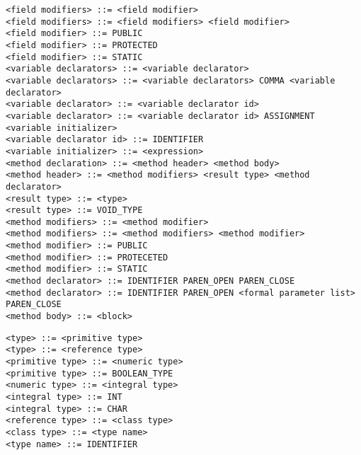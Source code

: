 \documentclass [a4paper,abstracton,titlepage]{scrartcl}
\begin{document}
\begin{lstlisting}
<field modifiers> ::= <field modifier>
<field modifiers> ::= <field modifiers> <field modifier>
<field modifier> ::= PUBLIC
<field modifier> ::= PROTECTED
<field modifier> ::= STATIC
<variable declarators> ::= <variable declarator>
<variable declarators> ::= <variable declarators> COMMA <variable declarator>
<variable declarator> ::= <variable declarator id>
<variable declarator> ::= <variable declarator id> ASSIGNMENT <variable initializer>
<variable declarator id> ::= IDENTIFIER
<variable initializer> ::= <expression>
<method declaration> ::= <method header> <method body>
<method header> ::= <method modifiers> <result type> <method declarator>
<result type> ::= <type>
<result type> ::= VOID_TYPE
<method modifiers> ::= <method modifier>
<method modifiers> ::= <method modifiers> <method modifier>
<method modifier> ::= PUBLIC
<method modifier> ::= PROTECETED
<method modifier> ::= STATIC
<method declarator> ::= IDENTIFIER PAREN_OPEN PAREN_CLOSE
<method declarator> ::= IDENTIFIER PAREN_OPEN <formal parameter list> PAREN_CLOSE
<method body> ::= <block>\end{lstlisting}

\begin{lstlisting}<type> ::= <primitive type>
<type> ::= <reference type>
<primitive type> ::= <numeric type>
<primitive type> ::= BOOLEAN_TYPE
<numeric type> ::= <integral type>
<integral type> ::= INT
<integral type> ::= CHAR
<reference type> ::= <class type>
<class type> ::= <type name>
<type name> ::= IDENTIFIER\end{lstlisting}
\end{document}
